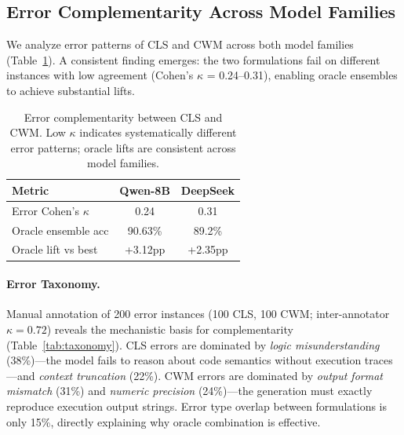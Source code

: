 \documentclass[11pt,a4paper]{article}
\begin{document}
\subsection{Error Complementarity Across Model Families}
\label{sec:complementarity}

We analyze error patterns of CLS and CWM across both model families (Table~\ref{tab:complementarity}). A consistent finding emerges: the two formulations fail on different instances with low agreement (Cohen's $\kappa$ = 0.24--0.31), enabling oracle ensembles to achieve substantial lifts.

\begin{table}[t]
\centering
\small
\begin{tabular}{lcc}
\toprule
\textbf{Metric} & \textbf{Qwen-8B} & \textbf{DeepSeek} \\
\midrule
Error Cohen's $\kappa$ & 0.24 & 0.31 \\
Oracle ensemble acc & 90.63\% & 89.2\% \\
Oracle lift vs best & +3.12pp & +2.35pp \\
\bottomrule
\end{tabular}
\caption{Error complementarity between CLS and CWM. Low $\kappa$ indicates systematically different error patterns; oracle lifts are consistent across model families.}
\label{tab:complementarity}
\end{table}

\paragraph{Error Taxonomy.} Manual annotation of 200 error instances (100 CLS, 100 CWM; inter-annotator $\kappa=0.72$) reveals the mechanistic basis for complementarity (Table~\ref{tab:taxonomy}). CLS errors are dominated by \emph{logic misunderstanding} (38\%)---the model fails to reason about code semantics without execution traces---and \emph{context truncation} (22\%). CWM errors are dominated by \emph{output format mismatch} (31\%) and \emph{numeric precision} (24\%)---the generation must exactly reproduce execution output strings. Error type overlap between formulations is only 15\%, directly explaining why oracle combination is effective.
\end{document}
